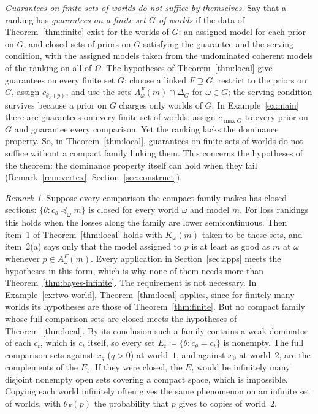 \documentclass[11pt]{article}
\theoremstyle{definition}
\theoremstyle{remark}
\newtheorem{remark}[theorem]{Remark}
\begin{document}
\emph{Guarantees on finite sets of worlds do not suffice by themselves.} Say that a ranking has \emph{guarantees on a finite set $G$ of worlds} if the data of Theorem~\ref{thm:finite} exist for the worlds of $G$: an assigned model for each prior on $G$, and closed sets of priors on $G$ satisfying the guarantee and the serving condition, with the assigned models taken from the undominated coherent models of the ranking on all of $\Omega$. The hypotheses of Theorem~\ref{thm:local} give guarantees on every finite set $G$: choose a linked $F\supseteq G$, restrict to the priors on $G$, assign $c_{\theta_F(p)}$, and use the sets $A^F_\omega(m)\cap\Delta_G$ for $\omega\in G$; the serving condition survives because a prior on $G$ charges only worlds of $G$. In Example~\ref{ex:main} there are guarantees on every finite set of worlds: assign $e_{\max G}$ to every prior on $G$ and guarantee every comparison. Yet the ranking lacks the dominance property. So, in Theorem~\ref{thm:local}, guarantees on finite sets of worlds do not suffice without a compact family linking them. This concerns the hypotheses of the theorem: the dominance property itself can hold when they fail (Remark~\ref{rem:vertex}, Section~\ref{sec:construct}).

\begin{remark}\label{rem:closed-comparisons}
Suppose every comparison the compact family makes has closed sections: $\{\theta:c_\theta\preceq_\omega m\}$ is closed for every world $\omega$ and model $m$. For loss rankings this holds when the losses along the family are lower semicontinuous. Then item~1 of Theorem~\ref{thm:local} holds with $K_\omega(m)$ taken to be these sets, and item~2(a) says only that the model assigned to $p$ is at least as good as $m$ at $\omega$ whenever $p\in A^F_\omega(m)$. Every application in Section~\ref{sec:apps} meets the hypotheses in this form, which is why none of them needs more than Theorem~\ref{thm:bayes-infinite}. The requirement is not necessary. In Example~\ref{ex:two-world}, Theorem~\ref{thm:local} applies, since for finitely many worlds its hypotheses are those of Theorem~\ref{thm:finite}. But no compact family whose full comparison sets are closed meets the hypotheses of Theorem~\ref{thm:local}. By its conclusion such a family contains a weak dominator of each $c_t$, which is $c_t$ itself, so every set $E_t\coloneqq\{\theta:c_\theta=c_t\}$ is nonempty. The full comparison sets against $x_q$ ($q>0$) at world~$1$, and against $x_0$ at world~$2$, are the complements of the $E_t$. If they were closed, the $E_t$ would be infinitely many disjoint nonempty open sets covering a compact space, which is impossible. Copying each world infinitely often gives the same phenomenon on an infinite set of worlds, with $\theta_F(p)$ the probability that $p$ gives to copies of world~$2$.
\end{remark}
\end{document}
